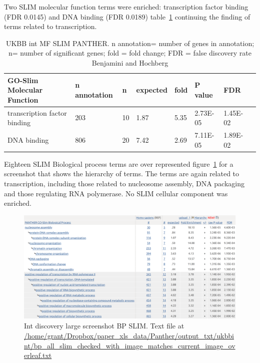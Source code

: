 Two SLIM molecular function terms were enriched: transcription factor binding (FDR 0.0145) and DNA binding (FDR 0.0189)
table~\ref{tab:ukbbint mf slim panther} continuing the finding of terms related to transcription.
  	\begin{table}[]
  	    \centering
  	    \begin{tabular}{llllllll}
  	    \toprule
  	GO-Slim Molecular Function &	n annotation & n&		expected 	&fold  &	 P value& 	FDR\\
  	   \midrule
transcription factor binding &	203 &	10& 	1.87 &	5.35  &	2.73E-05 &	1.45E-02\\
DNA binding &	806 &	20& 	7.42& 	2.69& 		7.11E-05& 	1.89E-02\\
\bottomrule
  	    \end{tabular}
  	    \caption{UKBB int MF SLIM PANTHER. n annotation= number of genes in annotation; n= number of significant genes; fold = fold change; FDR = false discovery rate Benjamini and Hochberg}
  	    \label{tab:ukbbint mf slim panther}
  	\end{table}
  	
Eighteen SLIM Biological process terms are over represented figure~\ref{fig:ukbb_int_BP_GO_SLIM} for a screenshot that shows the hierarchy of terms. The terms are again related to transcription, including those related to nucleosome assembly, DNA packaging and those regulating RNA polymerase. No SLIM cellular component was enriched. 

\begin{figure}
    \centering
    \includegraphics[width=\textwidth]{images/chapter2/large_screenshots/int_discovery_large_bp_slim_panther.png}
    \caption{Int discovery large screenshot BP SLIM. Text file at \url{/home/grant/Dropbox/paper_xls_data/Panther/output_txt/ukbbint/bp_all_slim_checked_with_image_matches_current_image_overleaf.txt}}
    \label{fig:ukbb_int_BP_GO_SLIM}
\end{figure}

